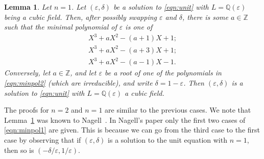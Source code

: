 \documentclass{amsart}
\newcommand{\Q}{\mathbb{Q}}
\newcommand{\Z}{\mathbb{Z}}
\newtheorem{lem}[thm]{Lemma}
\theoremstyle{definition}
\theoremstyle{remark}
\begin{document}
\begin{lem}\label{lem:minpol1}
	Let $n=1$. Let $(\varepsilon,\delta)$ be a solution
		to \eqref{eqn:unit} with $L=\Q(\varepsilon)$ being
		a cubic field. Then,
		after possibly swapping $\varepsilon$ and $\delta$,
		there is some $a \in \Z$
		such that the minimal polynomial
		of $\varepsilon$ is one of
		\begin{equation}\label{eqn:minpol1}
			\begin{split}
			X^3+aX^2-(a+1)X+1; \\
			X^3+aX^2-(a+3)X+1; \\
			X^3+aX^2-(a-1)X-1.
			\end{split}
		\end{equation}
		Conversely, let $a \in \Z$, and let $\varepsilon$
		be a root of one of the polynomials in \eqref{eqn:minpol2} (which are irreducible),
		and write $\delta=1-\varepsilon$. Then $(\varepsilon,\delta)$
		is a solution to \eqref{eqn:unit} with $L=\Q(\varepsilon)$
		a cubic field.
	\end{lem}
The proofs for $n=2$ and $n=1$ are similar to the previous cases. We note that Lemma~\ref{lem:minpol1} was known to Nagell~\cite{Nagell2}. In Nagell's paper
only the first two cases of \eqref{eqn:minpol1} are given. This is because we can go from the 
third case to the first case by observing that if $(\varepsilon,\delta)$ is a solution to the
unit equation with $n=1$, then so is $(-\delta/\varepsilon,1/\varepsilon)$.

\end{document}
